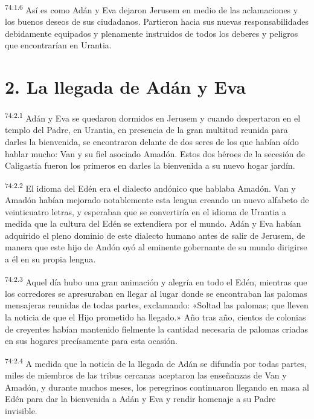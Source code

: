 \par
\textsuperscript{74:1.6} Así es como Adán y Eva dejaron Jerusem en medio de las aclamaciones y los buenos deseos de sus ciudadanos. Partieron hacia sus nuevas responsabilidades debidamente equipados y plenamente instruidos de todos los deberes y peligros que encontrarían en Urantia.

\section*{2. La llegada de Adán y Eva}
\par
\textsuperscript{74:2.1} Adán y Eva se quedaron dormidos en Jerusem y cuando despertaron en el templo del Padre, en Urantia, en presencia de la gran multitud reunida para darles la bienvenida, se encontraron delante de dos seres de los que habían oído hablar mucho: Van y su fiel asociado Amadón. Estos dos héroes de la secesión de Caligastia fueron los primeros en darles la bienvenida a su nuevo hogar jardín.

\par
\textsuperscript{74:2.2} El idioma del Edén era el dialecto andónico que hablaba Amadón. Van y Amadón habían mejorado notablemente esta lengua creando un nuevo alfabeto de veinticuatro letras, y esperaban que se convertiría en el idioma de Urantia a medida que la cultura del Edén se extendiera por el mundo. Adán y Eva habían adquirido el pleno dominio de este dialecto humano antes de salir de Jerusem, de manera que este hijo de Andón oyó al eminente gobernante de su mundo dirigirse a él en su propia lengua.

\par
\textsuperscript{74:2.3} Aquel día hubo una gran animación y alegría en todo el Edén, mientras que los corredores se apresuraban en llegar al lugar donde se encontraban las palomas mensajeras reunidas de todas partes, exclamando: «Soltad las palomas; que lleven la noticia de que el Hijo prometido ha llegado.» Año tras año, cientos de colonias de creyentes habían mantenido fielmente la cantidad necesaria de palomas criadas en sus hogares precísamente para esta ocasión.

\par
\textsuperscript{74:2.4} A medida que la noticia de la llegada de Adán se difundía por todas partes, miles de miembros de las tribus cercanas aceptaron las enseñanzas de Van y Amadón, y durante muchos meses, los peregrinos continuaron llegando en masa al Edén para dar la bienvenida a Adán y Eva y rendir homenaje a su Padre invisible.


